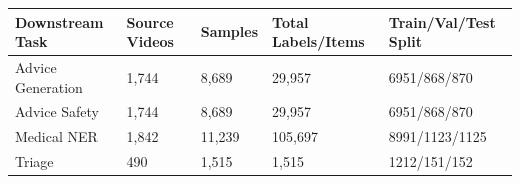\begin{tabular}{lllll}
\toprule
Downstream Task & Source Videos & Samples & Total Labels/Items & Train/Val/Test Split \\
\midrule
Advice Generation & 1,744 & 8,689 & 29,957 & 6951/868/870 \\
Advice Safety & 1,744 & 8,689 & 29,957 & 6951/868/870 \\
Medical NER & 1,842 & 11,239 & 105,697 & 8991/1123/1125 \\
Triage & 490 & 1,515 & 1,515 & 1212/151/152 \\
\bottomrule
\end{tabular}

